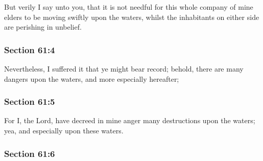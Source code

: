 		But verily I say unto you, that it is not needful for this whole company of mine elders to be moving swiftly upon the waters, whilst the inhabitants on either side are perishing in unbelief.


	\subsubsection{Section 61:4} %
		\label{DC61-4}

		Nevertheless, I suffered it that ye might bear record; behold, there are many dangers upon the waters, and more especially hereafter;


	\subsubsection{Section 61:5} %
		\label{DC61-5}

		For I, the Lord, have decreed in mine anger many destructions upon the waters; yea, and especially upon these waters.


	\subsubsection{Section 61:6} %
		\label{DC61-6}

